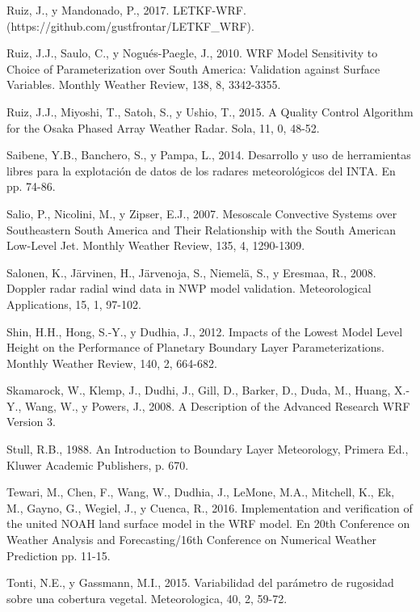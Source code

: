 \documentclass[12pt,spanish,oneside, a4paper]{book}
\begin{document}
\hypertarget{ref-Ruiz2017}{}
Ruiz, J., y Mandonado, P., 2017. LETKF-WRF.
(https://github.com/gustfrontar/LETKF\_WRF).

\hypertarget{ref-Ruiz2010}{}
Ruiz, J.J., Saulo, C., y Nogués-Paegle, J., 2010. WRF Model Sensitivity
to Choice of Parameterization over South America: Validation against
Surface Variables. Monthly Weather Review, 138, 8, 3342-3355.

\hypertarget{ref-Ruiz2015}{}
Ruiz, J.J., Miyoshi, T., Satoh, S., y Ushio, T., 2015. A Quality Control
Algorithm for the Osaka Phased Array Weather Radar. Sola, 11, 0, 48-52.

\hypertarget{ref-Saibene2014}{}
Saibene, Y.B., Banchero, S., y Pampa, L., 2014. Desarrollo y uso de
herramientas libres para la explotación de datos de los radares
meteorológicos del INTA. En pp. 74-86.

\hypertarget{ref-Salio2007}{}
Salio, P., Nicolini, M., y Zipser, E.J., 2007. Mesoscale Convective
Systems over Southeastern South America and Their Relationship with the
South American Low-Level Jet. Monthly Weather Review, 135, 4, 1290-1309.

\hypertarget{ref-Salonen2008}{}
Salonen, K., Järvinen, H., Järvenoja, S., Niemelä, S., y Eresmaa, R.,
2008. Doppler radar radial wind data in NWP model validation.
Meteorological Applications, 15, 1, 97-102.

\hypertarget{ref-Shin2012}{}
Shin, H.H., Hong, S.-Y., y Dudhia, J., 2012. Impacts of the Lowest Model
Level Height on the Performance of Planetary Boundary Layer
Parameterizations. Monthly Weather Review, 140, 2, 664-682.

\hypertarget{ref-Skamarock2008}{}
Skamarock, W., Klemp, J., Dudhi, J., Gill, D., Barker, D., Duda, M.,
Huang, X.-Y., Wang, W., y Powers, J., 2008. A Description of the
Advanced Research WRF Version 3.

\hypertarget{ref-Stull1988}{}
Stull, R.B., 1988. An Introduction to Boundary Layer Meteorology,
Primera Ed., Kluwer Academic Publishers, p. 670.

\hypertarget{ref-Tewari2004}{}
Tewari, M., Chen, F., Wang, W., Dudhia, J., LeMone, M.A., Mitchell, K.,
Ek, M., Gayno, G., Wegiel, J., y Cuenca, R., 2016. Implementation and
verification of the united NOAH land surface model in the WRF model. En
20th Conference on Weather Analysis and Forecasting/16th Conference on
Numerical Weather Prediction pp. 11-15.

\hypertarget{ref-Tonti2015}{}
Tonti, N.E., y Gassmann, M.I., 2015. Variabilidad del parámetro de
rugosidad sobre una cobertura vegetal. Meteorologica, 40, 2, 59-72.
\end{document}
